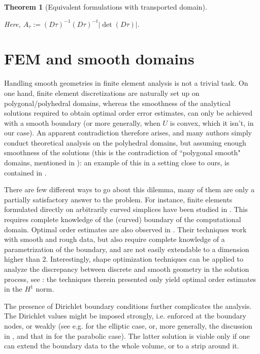 \documentclass[english,a4paper,10pt,oneside]{scrbook}	%
\theoremstyle{break}
\newtheorem{thm}[equation]{Theorem}
\theoremstyle{remark}
\begin{document}
\begin{appendices}
\begin{thm}[Equivalent formulations with transported domain]
\begin{itemize}
\end{itemize}

Here, $A_\tau:=  (D\tau)^{-1}(D\tau)^{-t}|\det(D\tau)|$.

\end{thm}

\chapter{FEM and smooth domains}
\label{chap:inh_fem}
Handling smooth geometries in finite element analysis is not a trivial task. On one hand, finite element discretizations are naturally set up on polygonal/polyhedral domains, whereas the smoothness of the analytical solutions required to obtain optimal order error estimates, can only be achieved with a smooth boundary (or more generally, when $U$ is convex, which it isn't, in our case). An apparent contradiction therefore arises, and many authors simply conduct theoretical analysis on the polyhedral domains, but assuming enough smoothness of the solutions (this is the contradiction of ``polygonal smooth" domains, mentioned in \cite{tiihonen}): an example of this in a setting close to ours, is contained in \cite{paganini}. 

There are few different ways to go about this dilemma, many of them are only a partially satisfactory answer to the problem. For instance, finite elements formulated directly on arbitrarily curved simplices have been studied in \cite{zlamal}. This requires complete knowledge of the (curved) boundary of the computational domain. Optimal order estimates are also observed in \cite{bramble}. Their techniques work with smooth and rough data, but also require complete knowledge of a parametrization of the boundary, and are not easily extendable to a dimension higher than $2$. Interestingly, shape optimization techniques can be applied to analyze the discrepancy between discrete and smooth geometry in the solution process, see \cite{tiihonen}: the techniques therein presented only yield optimal order estimates in the $H^1$ norm.

The presence of Dirichlet boundary conditions further complicates the analysis. The Dirichlet values might be imposed strongly, i.e. enforced at the boundary nodes, or weakly (see e.g. \cite{chiba} for the elliptic case, or, more generally, the discussion in \cite{chouly}, and that in \cite{benner} for the parabolic case). The latter solution is viable only if one can extend the boundary data to the whole volume, or to a strip around it.


\end{appendices}
\end{document}
